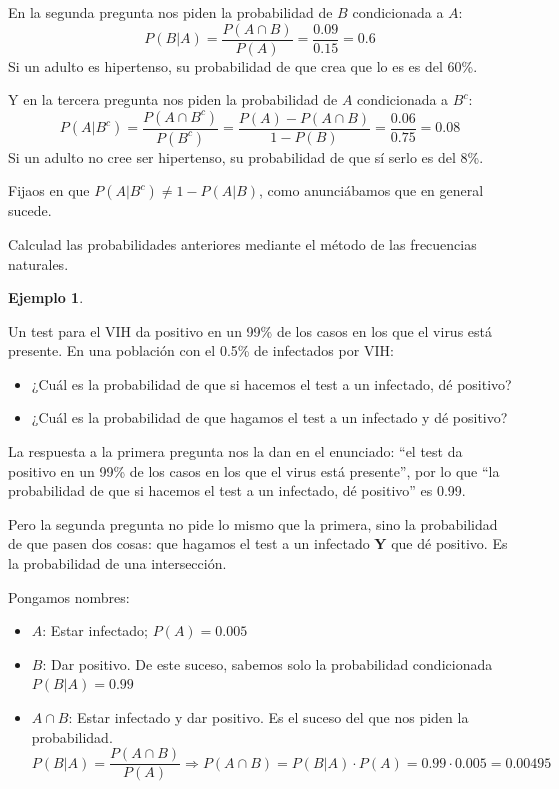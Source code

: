 \documentclass[
]{book}
\theoremstyle{definition}
\theoremstyle{definition}
\newtheorem{example}{Ejemplo}[chapter]
\theoremstyle{definition}
\theoremstyle{definition}
\theoremstyle{remark}
\begin{document}
En la segunda pregunta nos piden la probabilidad de \(B\) condicionada a \(A\):
\[
P(B|A) =\frac{P(A\cap B)}{P(A)}=\frac{0.09}{0.15}=0.6
\]
Si un adulto es hipertenso, su probabilidad de que crea que lo es es del 60\%.

Y en la tercera pregunta nos piden la probabilidad de \(A\) condicionada a \(B^c\):
\[
P(A|B^c) =\frac{P(A\cap B^c)}{P(B^c)}=\frac{P(A)-P(A\cap B)}{1-P(B)}=\frac{0.06}{0.75}=0.08
\]
Si un adulto no cree ser hipertenso, su probabilidad de que sí serlo es del 8\%.

\begin{rmdnote}
Fijaos en que \(P(A|B^c)\neq 1-P(A|B)\), como anunciábamos que en general sucede.
\end{rmdnote}

\begin{rmdexercici}
Calculad las probabilidades anteriores mediante el método de las frecuencias naturales.
\end{rmdexercici}

\begin{example}
\protect\hypertarget{exm:unnamed-chunk-121}{}\label{exm:unnamed-chunk-121}

Un test para el VIH da positivo en un 99\% de los casos en los que el virus está presente. En una población con el 0.5\% de infectados por VIH:

\begin{itemize}
\item
  ¿Cuál es la probabilidad de que si hacemos el test a un infectado, dé positivo?
\item
  ¿Cuál es la probabilidad de que hagamos el test a un infectado y dé positivo?
\end{itemize}

\end{example}

La respuesta a la primera pregunta nos la dan en el enunciado: ``el test da positivo en un 99\% de los casos en los que el virus está presente'', por lo que ``la probabilidad de que si hacemos el test a un infectado, dé positivo'' es 0.99.

Pero la segunda pregunta no pide lo mismo que la primera, sino la probabilidad de que pasen dos cosas: que hagamos el test a un infectado \textbf{Y} que dé positivo. Es la probabilidad de una intersección.

Pongamos nombres:

\begin{itemize}
\item
  \(A\): Estar infectado; \(P(A)=0.005\)
\item
  \(B\): Dar positivo. De este suceso, sabemos solo la probabilidad condicionada \(P(B|A)=0.99\)
\item
  \(A\cap B\): Estar infectado y dar positivo. Es el suceso del que nos piden la probabilidad.
  \[
  P(B|A)=\frac{P(A \cap B)}{P(A)}\Longrightarrow  P(A \cap B)=P(B|A)\cdot P(A)=0.99\cdot 0.005=0.00495
  \]
\end{itemize}
\end{document}
